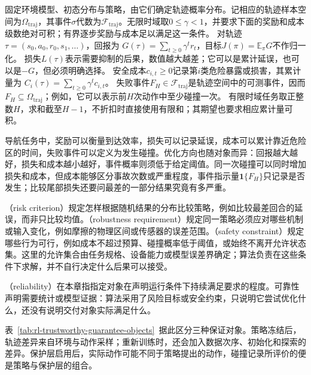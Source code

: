 \begin{definition}[回报、损失、成本与失败事件]
  \label{def:rl-trustworthy-objects}
  固定环境模型、初态分布与策略，由它们确定轨迹概率分布。记相应的轨迹样本空间为$\Omega_{\mathrm{traj}}$，其事件$\sigma$代数为$\mathcal F_{\mathrm{traj}}$。无限时域取$0\leq\gamma<1$，并要求下面的奖励和成本级数绝对可积；有界逐步奖励与成本足以满足这一条件。
  对轨迹$\tau=(s_0,a_0,r_0,s_1,\ldots)$，回报为
  $G(\tau)=\sum_{t\geq0}\gamma^t r_t$，目标$J(\pi)=\mathbb E_\pi G$不作归一化。
  损失$L(\tau)$表示需要抑制的后果，数值越大越差；它可以是累计延误，也可以是$-G$，但必须明确选择。
  安全成本$c_{i,t}\geq0$记录第$i$类危险暴露或损害，其累计量为
  $C_i(\tau)=\sum_{t\geq0}\gamma^t c_{i,t}$。
  失败事件$F_H\in\mathcal F_{\mathrm{traj}}$是轨迹空间中的可测事件，因而$F_H\subseteq\Omega_{\mathrm{traj}}$；例如，它可以表示前$H$次动作中至少碰撞一次。
  有限时域任务取正整数$H$，求和截至$H-1$，不折扣时直接使用有限和；其期望也要求相应累计量可积。
\end{definition}

导航任务中，奖励可以衡量到达效率，损失可以记录延误，成本可以累计靠近危险区的时间，失败事件可以定义为发生碰撞。优化方向也随对象而异：回报越大越好，损失和成本越小越好，事件概率则须低于给定阈值。同一次碰撞可以同时增加损失和成本，但成本能够区分事故次数或严重程度，事件指示量$\mathbf 1\{F_H\}$只记录是否发生；比较尾部损失还要问最差的一部分结果究竟有多严重。

（risk criterion）规定怎样根据随机结果的分布比较策略，例如比较最差回合的延误，而非只比较均值。（robustness requirement）规定同一策略必须应对哪些机制或输入变化，例如摩擦的物理区间或传感器的误差范围。（safety constraint）规定哪些行为可行，例如成本不超过预算、碰撞概率低于阈值，或始终不离开允许状态集。这里的允许集合由任务规格、设备能力或模型误差界确定；算法负责在这些条件下求解，并不自行决定什么后果可以接受。

（reliability）在本章指指定对象在声明运行条件下持续满足要求的程度。可靠性声明需要统计或模型证据：算法采用了风险目标或安全约束，只说明它尝试优化什么，还没有说明交付对象实际满足什么。

表~\ref{tab:rl-trustworthy-guarantee-objects}~据此区分三种保证对象。策略冻结后，轨迹差异来自环境与动作采样；重新训练时，还会加入数据次序、初始化和探索的差异。保护层启用后，实际动作可能不同于策略提出的动作，碰撞记录所评价的便是策略与保护层的组合。

